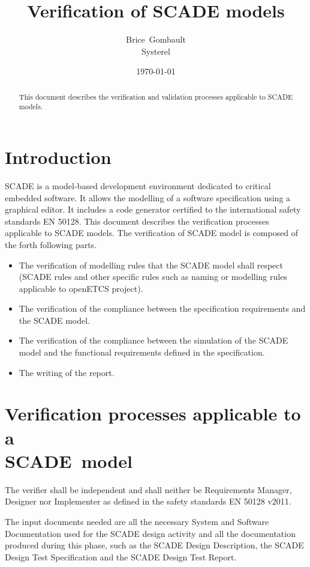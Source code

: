 \documentclass{article}
\title{Verification of SCADE models}
\author{Brice~Gombault\\Systerel}
\date{\today}
\begin{document}
\maketitle

\begin{abstract}
This document describes the verification and validation processes applicable to SCADE models.
\end{abstract}

\tableofcontents

\newpage

\section{Introduction}

SCADE is a model-based development environment dedicated to critical embedded software. It allows the modelling of a software specification using a graphical editor. It includes a code generator certified to the international safety standards EN 50128. This document describes the verification processes applicable to SCADE models.
The verification of SCADE model is composed of the forth following parts.
\begin{itemize}
\item The verification of modelling rules that the SCADE model shall respect (SCADE rules and other specific rules such as naming or modelling rules applicable to openETCS project).
\item The verification of the compliance between the specification requirements and the SCADE model.
\item The verification of the compliance between the simulation of the SCADE model and the functional requirements defined in the specification.
\item The writing of the report.
\end{itemize}

\section{Verification processes applicable to a\\SCADE~model}

The verifier shall be independent and shall neither be Requirements Manager, Designer nor Implementer as defined in the safety standards EN 50128 v2011.

The input documents needed are all the necessary System and Software Documentation used for the SCADE design activity and all the documentation produced during this phase, such as the SCADE Design Description, the SCADE Design Test Specification and the SCADE Design Test Report.
\end{document}
